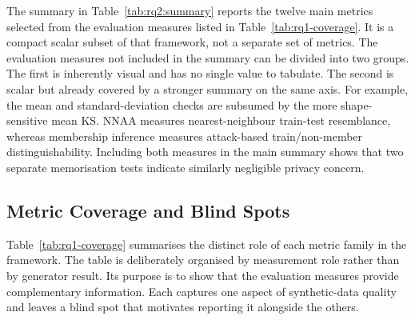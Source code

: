 The summary in Table~\ref{tab:rq2:summary} reports the
twelve main metrics selected from the evaluation measures listed in
Table~\ref{tab:rq1-coverage}. It is a
compact scalar subset of that framework, not a separate set of metrics.
The evaluation measures not included in the summary can be divided into
two groups. The first is inherently visual and has no single value to tabulate. 
The second is scalar but already covered by a stronger
summary on the same axis. For example, the mean and standard-deviation checks are
subsumed by the more shape-sensitive mean KS. NNAA
measures nearest-neighbour train-test resemblance, whereas membership
inference measures attack-based train/non-member distinguishability.
Including both measures in the main summary shows that two separate
memorisation tests indicate similarly negligible privacy concern.

\subsection{Metric Coverage and Blind Spots}
\label{sec:results:rq1:diagnostic}

Table~\ref{tab:rq1-coverage} summarises the distinct role of each metric
family in the framework. The table is deliberately organised by
measurement role rather than by generator result. Its purpose is to 
show that the evaluation measures provide
complementary information. Each captures one aspect of
synthetic-data quality and leaves a blind spot that motivates reporting it
alongside the others.


